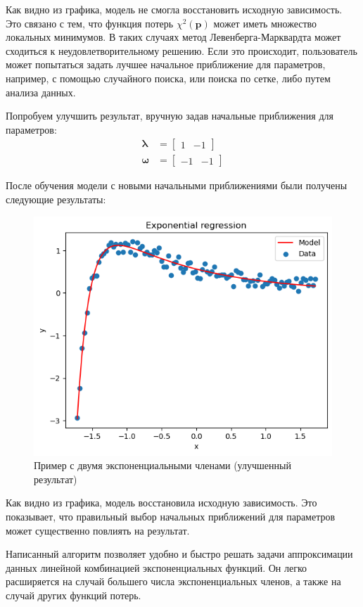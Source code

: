 Как видно из графика, модель не смогла восстановить исходную зависимость. Это связано с тем, что функция потерь $\chi^2(\mathbf{p})$ может иметь множество локальных минимумов. В таких случаях метод Левенберга-Марквардта может сходиться к неудовлетворительному решению. Если это происходит, пользователь может попытаться задать лучшее начальное приближение для параметров, например, с помощью случайного поиска, или поиска по сетке, либо путем анализа данных.

Попробуем улучшить результат, вручную задав начальные приближения для параметров:
$$
	\begin{aligned}
		\boldsymbol{\lambda} & = \begin{bmatrix} 1 & -1 \end{bmatrix}  \\
		\boldsymbol{\omega}  & = \begin{bmatrix} -1 & -1 \end{bmatrix}
	\end{aligned}
$$

После обучения модели с новыми начальными приближениями были получены следующие результаты:

\begin{figure}[h!]
	\centering
	\includegraphics[width=0.7\linewidth]{../img/ex2_good.png}
	\caption{Пример с двумя экспоненциальными членами (улучшенный результат)}
\end{figure}


Как видно из графика, модель восстановила исходную зависимость. Это показывает, что правильный выбор начальных приближений для параметров может существенно повлиять на результат.

Написанный алгоритм позволяет удобно и быстро решать задачи аппроксимации данных линейной комбинацией экспоненциальных функций. Он легко расширяется на случай большего числа экспоненциальных членов, а также на случай других функций потерь.


